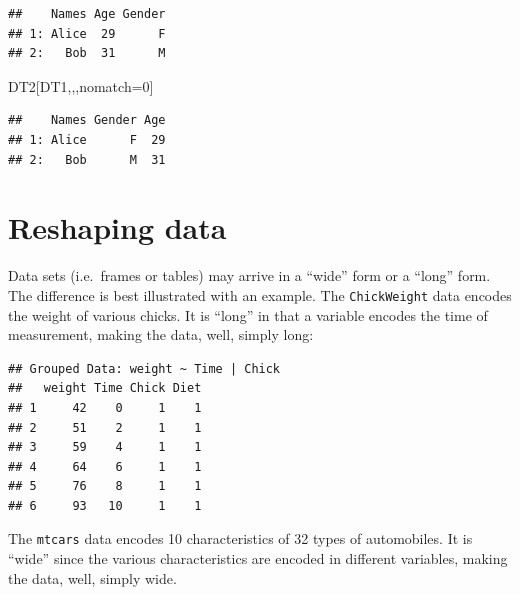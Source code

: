 \documentclass[]{book}
\newenvironment{Shaded}{\begin{snugshade}}{\end{snugshade}}
\newcommand{\DecValTok}[1]{\textcolor[rgb]{0.00,0.00,0.81}{#1}}
\newcommand{\StringTok}[1]{\textcolor[rgb]{0.31,0.60,0.02}{#1}}
\newcommand{\OperatorTok}[1]{\textcolor[rgb]{0.81,0.36,0.00}{\textbf{#1}}}
\newcommand{\NormalTok}[1]{#1}
\theoremstyle{definition}
\theoremstyle{definition}
\theoremstyle{definition}
\theoremstyle{remark}
\begin{document}
\begin{verbatim}
##    Names Age Gender
## 1: Alice  29      F
## 2:   Bob  31      M
\end{verbatim}

\begin{Shaded}
\begin{Highlighting}[]
\NormalTok{DT2[DT1,,,nomatch=}\DecValTok{0}\NormalTok{]}
\end{Highlighting}
\end{Shaded}

\begin{verbatim}
##    Names Gender Age
## 1: Alice      F  29
## 2:   Bob      M  31
\end{verbatim}

\section{Reshaping data}\label{reshaping-data}

Data sets (i.e.~frames or tables) may arrive in a ``wide'' form or a
``long'' form. The difference is best illustrated with an example. The
\texttt{ChickWeight} data encodes the weight of various chicks. It is
``long'' in that a variable encodes the time of measurement, making the
data, well, simply long:

\begin{Shaded}
\end{Shaded}

\begin{verbatim}
## Grouped Data: weight ~ Time | Chick
##   weight Time Chick Diet
## 1     42    0     1    1
## 2     51    2     1    1
## 3     59    4     1    1
## 4     64    6     1    1
## 5     76    8     1    1
## 6     93   10     1    1
\end{verbatim}

The \texttt{mtcars} data encodes 10 characteristics of 32 types of
automobiles. It is ``wide'' since the various characteristics are
encoded in different variables, making the data, well, simply wide.

\begin{Shaded}
\end{Shaded}
\end{document}
